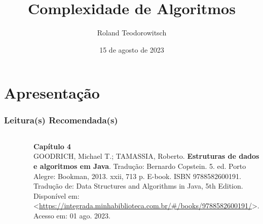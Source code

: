 \documentclass[aspectratio=169]{beamer}
\title[\sc{Complexidade de Algoritmos}]{Complexidade de Algoritmos}
\author[Roland Teodorowitsch]{Roland Teodorowitsch}
\institute[ALEST I - EP - PUCRS]{Algoritmos e Estruturas de Dados I - Escola Politécnica - PUCRS}
\date{15 de agosto de 2023}
\begin{document}
\justifying

\begin{frame}
	\titlepage
\end{frame}

\section{Apresentação}

\begin{frame}\frametitle{Leitura(s) Recomendada(s)}

\begin{columns}[T]
\begin{column}{0.15\linewidth}
\vspace{-3mm}
\begin{figure}[h]
	\centering
	\includegraphics[height=0.3\paperheight]{imagens/livro_goodrich.jpg}
\end{figure}
\end{column}
\begin{column}{0.85\linewidth}
\vspace{3mm}
\textbf{Capítulo 4}\\
\scriptsize{GOODRICH, Michael T.; TAMASSIA, Roberto. \textbf{Estruturas de dados e algoritmos em Java}. Tradução: Bernardo Copstein. 5. ed. Porto Alegre: Bookman, 2013. xxii, 713 p. E-book. ISBN 9788582600191. Tradução de: Data Structures and Algorithms in Java, 5th Edition. Disponível em: \textless{}\url{https://integrada.minhabiblioteca.com.br/\#/books/9788582600191/}\textgreater{}. Acesso em: 01 ago. 2023.}
\end{column}
\end{columns}

\vspace{5mm}


\end{frame}
\end{document}
